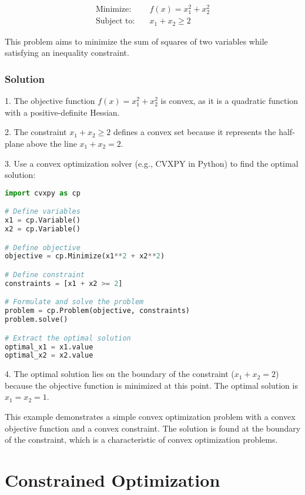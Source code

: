 \documentclass[a4paper]{article}
\begin{document}
\begin{align*}
\text{Minimize:} \quad & f(x) = x_1^2 + x_2^2 \\
\text{Subject to:} \quad & x_1 + x_2 \geq 2
\end{align*}

This problem aims to minimize the sum of squares of two variables while satisfying an inequality constraint.

\subsubsection{Solution}

1. The objective function \(f(x) = x_1^2 + x_2^2\) is convex, as it is a quadratic function with a positive-definite Hessian.

2. The constraint \(x_1 + x_2 \geq 2\) defines a convex set because it represents the half-plane above the line \(x_1 + x_2 = 2\).

3. Use a convex optimization solver (e.g., CVXPY in Python) to find the optimal solution:

\begin{lstlisting}[language=Python]
import cvxpy as cp

# Define variables
x1 = cp.Variable()
x2 = cp.Variable()

# Define objective
objective = cp.Minimize(x1**2 + x2**2)

# Define constraint
constraints = [x1 + x2 >= 2]

# Formulate and solve the problem
problem = cp.Problem(objective, constraints)
problem.solve()

# Extract the optimal solution
optimal_x1 = x1.value
optimal_x2 = x2.value
\end{lstlisting}

4. The optimal solution lies on the boundary of the constraint (\(x_1 + x_2 = 2\)) because the objective function is minimized at this point. The optimal solution is \(x_1 = x_2 = 1\).

This example demonstrates a simple convex optimization problem with a convex objective function and a convex constraint. The solution is found at the boundary of the constraint, which is a characteristic of convex optimization problems.

\section{Constrained Optimization}
\end{document}
